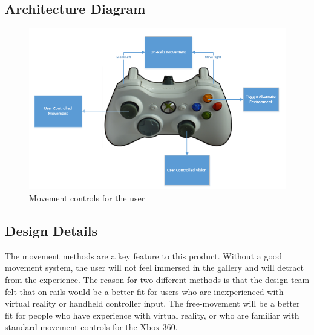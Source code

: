 
\subsection{ Architecture  Diagram}
\begin{figure}
\includegraphics[scale=1.0]{Diagrams/XboxControlDiagram.png}
\centering
\caption{Movement controls for the user}
\end{figure}




\subsection{Design Details}
The movement methods are a key feature to this product.  Without a good movement system, the user will not feel immersed in the gallery and will detract from the experience.  The reason for two different methods is that the design team felt that on-rails would be a better fit for users who are inexperienced with virtual reality or handheld controller input.  The free-movement will be a better fit for people who have experience with virtual reality, or who are familiar with standard movement controls for the Xbox 360.

